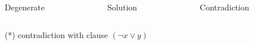 \begin{frame}

	\begin{columns}
        \begin{column}{3cm}
            Degenerate
        \end{column}
        \begin{column}{3cm}
            Solution
    \end{column}
        \begin{column}{3cm}
            Contradiction
        \end{column}
    \end{columns}

    
    \begin{columns}
        \begin{column}{3cm}
            
        \end{column}
        \begin{column}{3cm}
            
        \end{column}
        \begin{column}{3cm}
            
        \end{column}
    \end{columns}

    \vspace{3cm}
    \alert{(*)} contradiction with clause $(\neg x \lor y)$

\end{frame}

